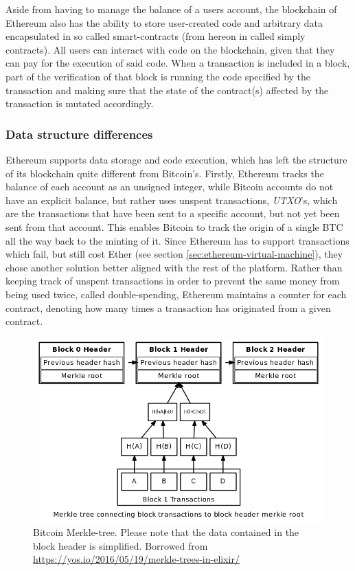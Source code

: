 \documentclass{article}
\begin{document}
		Aside from having to manage the balance of a users account, the blockchain of Ethereum also has the ability to store user-created code and arbitrary data encapsulated in so called smart-contracts (from hereon in called simply contracts). All users can interact with code on the blockchain, given that they can pay for the execution of said code. 
		When a transaction is included in a block, part of the verification of that block is running the code specified by the transaction and making sure that the state of the contract(s) affected by the transaction is mutated accordingly.

			\subsubsection{Data structure differences}
			Ethereum supports data storage and code execution, which has left the structure of its blockchain quite different from Bitcoin's.
			Firstly, Ethereum tracks the balance of each account as an unsigned integer, while Bitcoin accounts do not have an explicit balance, but rather uses unspent transactions, \emph{UTXO}'s, which are the transactions that have been sent to a specific account, but not yet been sent from that account. 
			This enables Bitcoin to track the origin of a single BTC all the way back to the minting of it.
			Since Ethereum has to support transactions which fail, but still cost Ether (see section \ref{sec:ethereum-virtual-machine}), they chose another solution better aligned with the rest of the platform.
			Rather than keeping track of unspent transactions in order to prevent the same money from being used twice, called double-spending, Ethereum maintains a counter for each contract, denoting how many times a transaction has originated from a given contract.

			\begin{figure}[!ht]
				\centering
				\includegraphics[scale=0.4, trim={0 1.2cm 0 0}, clip=true]{figures/merkle-tree.png}
			 	\caption[Bitcoin Merkle-tree]
			 	{Bitcoin Merkle-tree. Please note that the data contained in the block header is simplified. Borrowed from \url{https://yos.io/2016/05/19/merkle-trees-in-elixir/}}
			 	\label{fig:bitcoin-merkle-tree}
			\end{figure}
\end{document}
